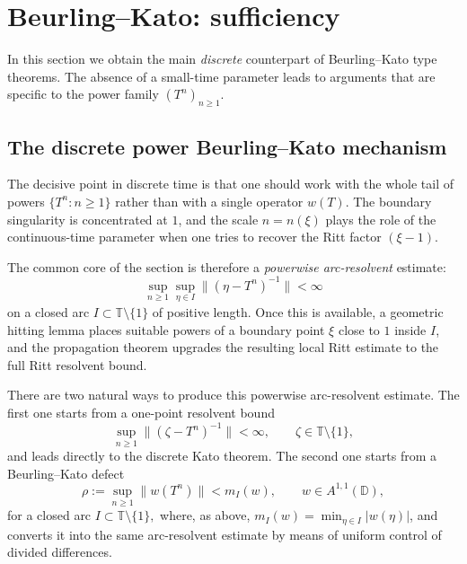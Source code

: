 \documentclass[11pt]{amsart}
\numberwithin{equation}{section}
\theoremstyle{definition}
\theoremstyle{plain}
\def\T{\mathbb{T}}
\def\D{\mathbb{D}}
\begin{document}
\section{Beurling--Kato: sufficiency}\label{sec:BK-sufficiency}

In this section we obtain the main \emph{discrete} counterpart of Beurling--Kato
type theorems. The absence of a small-time parameter leads to arguments that are
specific to the power family $(T^n)_{n\ge1}$.

\subsection{The discrete power Beurling--Kato mechanism}\label{subsec:discrete-KB-mechanism}

The decisive %
point in discrete time is that one should work with the whole tail
of powers $\{T^n:n\ge1\}$ rather than with a single operator $w(T)$. The
boundary singularity is concentrated at $1$, and the scale $n=n(\xi)$ plays the
role of the continuous-time parameter when one tries to recover the Ritt factor
$(\xi-1)$.

The common core of the section is therefore a \emph{powerwise arc-resolvent}
estimate:
\[
  \sup_{n\ge1}\sup_{\eta\in I}\|(\eta -T^n)^{-1}\|<\infty
\]
on a closed arc $I\subset\T\setminus\{1\}$ of positive length. Once this is
available, a geometric hitting lemma places suitable powers of a boundary point
$\xi$ close to $1$ inside $I$, and the propagation theorem upgrades the
resulting local Ritt estimate to the full Ritt resolvent bound.

There are two natural ways to produce this powerwise arc-resolvent estimate.
The first one starts from a one-point resolvent bound
\[
  \sup_{n\ge1}\|(\zeta -T^n)^{-1}\|<\infty,
  \qquad \zeta\in\T\setminus\{1\},
\]
and leads directly to the discrete Kato theorem. 
The second one starts from a
Beurling--Kato defect
\[
  \rho:=\sup_{n\ge1}\|w(T^n)\|<m_I(w),
  \qquad w\in A^{1,1}(\D),
\]
for a closed arc $I\subset \mathbb T\setminus \{1\},$ where, as above, $m_I(w)=\min_{\eta\in I}|w(\eta)|$, 
and converts it into the same arc-resolvent estimate by means of uniform control
of divided differences.
\end{document}
